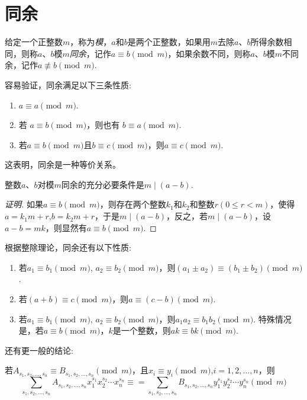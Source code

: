 
\section{同余}
\label{sec:congruences}

\begin{definition}
  给定一个正整数$m$，称为\emph{模}，$a$和$b$是两个正整数，如果用$m$去除$a$、$b$所得余数相同，则称$a$、$b$模$m$\emph{同余}，记作$a \equiv b \pmod{m}$，如果余数不同，则称$a$、$b$模$m$不同余，记作$a \not \equiv b \pmod{m}$.
\end{definition}

容易验证，同余满足以下三条性质:
\begin{enumerate}
\item $a \equiv a \pmod{m}$.
\item 若 $a \equiv b \pmod{m}$，则也有 $b \equiv a \pmod{m}$.
\item 若$a \equiv b \pmod{m}$且$b \equiv c \pmod{m}$，则$a \equiv c \pmod{m}$.
\end{enumerate}
这表明，同余是一种等价关系。

\begin{theorem}
  整数$a$、$b$对模$m$同余的充分必要条件是$m \mid (a-b)$.
\end{theorem}

\begin{proof}[证明]
  如果$a \equiv b \pmod{m}$，则存在两个整数$k_1$和$k_2$和整数$r(0 \leqslant r < m)$，使得$a=k_1m+r$,$b=k_2m+r$，于是$m \mid (a-b)$，反之，若$m \mid (a-b)$，设$a-b=mk$，则显然有$a \equiv b \pmod{m}$.
\end{proof}

\begin{theorem}
根据整除理论，同余还有以下性质:
\begin{enumerate}
\item 若$a_1 \equiv b_1 \pmod{m}$, $a_2 \equiv b_2 \pmod{m}$，则$(a_1\pm a_2) \equiv (b_1 \pm b_2) \pmod{m}$.
\item 若$(a+b) \equiv c \pmod{m}$，则$a \equiv (c-b) \pmod{m}$.
\item 若$a_1 \equiv b_1 \pmod{m}$, $a_2 \equiv b_2 \pmod{m}$，则$a_1a_2 \equiv b_1b_2 \pmod{m}$. 特殊情况是，若$a \equiv b \pmod{m}$，$k$是一个整数，则$ak \equiv bk \pmod{m}$.
\end{enumerate}
\end{theorem}

还有更一般的结论:
\begin{theorem}
  若$A_{s_1,s_2,\ldots,s_n} \equiv B_{s_1,s_2,\ldots,s_n} \pmod{m}$，且$x_i \equiv y_i \pmod{m}$,$i=1,2,\ldots,n$，则
  \[ \sum_{s_1,s_2,\ldots,s_n} A_{s_1,s_2,\ldots,s_n} x_1^{s_1}x_2^{s_2} \cdots x_n^{s_n} \equiv =  \sum_{s_1,s_2,\ldots,s_n} B_{s_1,s_2,\ldots,s_n} y_1^{s_1}y_2^{s_2} \cdots y_n^{s_n} \pmod{m} \]
\end{theorem}

